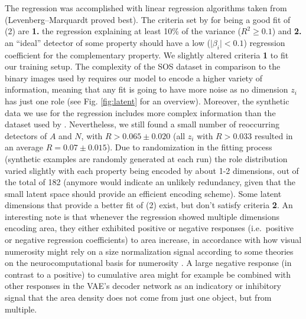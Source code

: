\documentclass[twocolumn]{article}
\begin{document}
\noindent The regression was accomplished with linear regression algorithms taken
from \citet{newville2016lmfit} (Levenberg--Marquardt proved best). The
criteria set by \citet{stoianov2012} for being a good fit of (2)
are \textbf{1.} the regression explaining at least 10\% of the variance
(\(R^2 \geq 0.1\)) and \textbf{2.}  an ``ideal'' detector of some
property should have a low (\(\mid\beta_i\mid < 0.1\)) regression
coefficient for the complementary property. We slightly altered criteria
\textbf{1} to fit our training setup. The complexity of the SOS
dataset in comparison to the binary images used by \citet{stoianov2012}
requires our model to encode a higher variety of information, meaning
that any fit is going to have more noise as no dimension \(z_i\) has just one
role (see Fig. \ref{fig:latent} for an overview). Moreover, the synthetic data we
use for the regression includes more complex information than the
dataset used by \citet{stoianov2012}. Nevertheless, we still found a
small number of reoccurring detectors of \(A\) and \(N\), with
\(R > 0.065 \pm 0.020\) (all \(z_i\) with \(R > 0.033\) resulted in an
average \(R= 0.07 \pm 0.015\)). Due to randomization in the fitting
process (synthetic examples are randomly generated at each run) the role
distribution varied slightly with each property being encoded by about
1-2 dimensions, out of the total of 182 (anymore would indicate an
unlikely redundancy, given that the small latent space should provide an
efficient encoding scheme). Some latent dimensions that provide a better
fit of (2) exist, but don't satisfy criteria \textbf{2}. An
interesting note is that whenever the regression showed multiple
dimensions encoding area, they either exhibited positive or negative
responses (i.e.~positive or negative regression coefficients) to area
increase, in accordance with how visual numerosity might rely on a size
normalization signal according to some theories on the
neurocomputational basis for numerosity \citep[for a discussion, see][]{stoianov2012}. A large negative response (in contrast to a
positive) to cumulative area might for example be combined with other
responses in the VAE's decoder network as an indicatory or inhibitory
signal that the area density does not come from just one object, but
from multiple.
\end{document}
